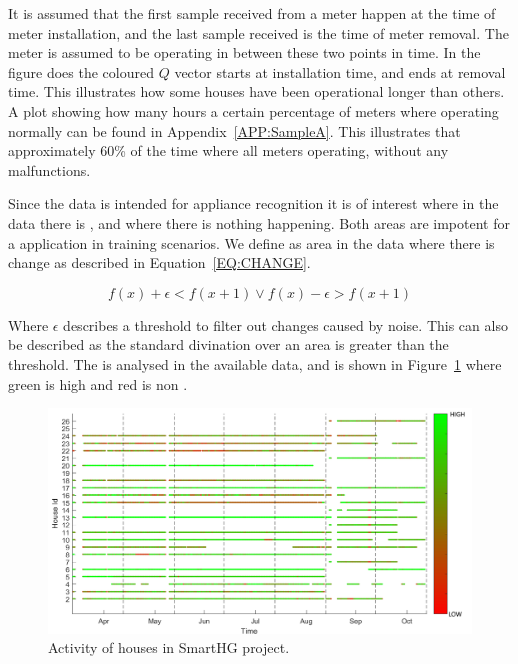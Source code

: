 It is assumed that the first sample received from a meter happen at the time of meter installation, and the last sample received is the time of meter removal. The meter is assumed to be operating in between these two points in time. In the figure does the coloured $Q$ vector starts at installation time, and ends at removal time. This illustrates how some houses have been operational longer than others. A plot showing how many hours a certain percentage of meters where operating normally can be found in Appendix~\ref{APP:SampleA}. This illustrates that approximately 60\% of the time where all meters operating, without any malfunctions.

Since the data is intended for appliance recognition it is of interest where in the data there is , and where there is nothing happening. Both areas are impotent for a  application in training scenarios. We define  as area in the data where there is change as described in Equation~\ref{EQ:CHANGE}.

\begin{equation}
f(x) + \epsilon < f(x+1) \vee f(x) - \epsilon > f(x+1)
\label{EQ:CHANGE}
\end{equation}

Where $\epsilon$ describes a threshold to filter out changes caused by noise. This can also be described as the standard divination over an area is greater than the threshold. The  is analysed in the available data, and is shown in Figure~\ref{fig:ActivityMap} where green is high  and red is non .

\begin{figure}[H]
\centering
\includegraphics[width=1\textwidth]{billeder/ActivityBig.png}
\caption{Activity of houses in SmartHG project.}
\label{fig:ActivityMap}
\end{figure}

